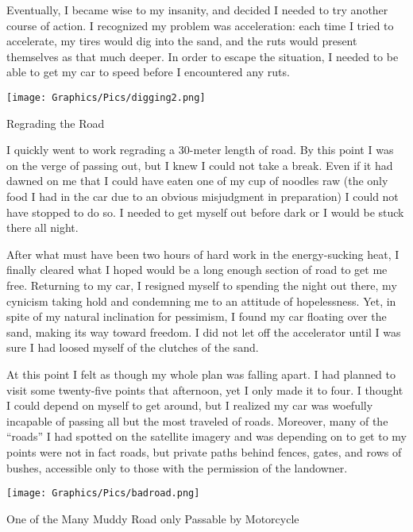 Eventually, I became wise to my insanity, and decided I needed to try another course of action. I recognized my problem was acceleration: each time I tried to accelerate, my tires would dig into the sand, and the ruts would present themselves as that much deeper. In order to escape the situation, I needed to be able to get my car to speed before I encountered any ruts.

\begin{ssfigure}
  \centering
  \texttt{[image: Graphics/Pics/digging2.png]}
  \caption{Regrading the Road}
  \label{pic:digging2}
\end{ssfigure}

I quickly went to work regrading a 30-meter length of road. By this point I was on the verge of passing out, but I knew I could not take a break. Even if it had dawned on me that I could have eaten one of my cup of noodles raw (the only food I had in the car due to an obvious misjudgment in preparation) I could not have stopped to do so. I needed to get myself out before dark or I would be stuck there all night.

After what must have been two hours of hard work in the energy-sucking heat, I finally cleared what I hoped would be a long enough section of road to get me free. Returning to my car, I resigned myself to spending the night out there, my cynicism taking hold and condemning me to an attitude of hopelessness. Yet, in spite of my natural inclination for pessimism, I found my car floating over the sand, making its way toward freedom. I did not let off the accelerator until I was sure I had loosed myself of the clutches of the sand.

At this point I felt as though my whole plan was falling apart. I had planned to visit some twenty-five points that afternoon, yet I only made it to four. I thought I could depend on myself to get around, but I realized my car was woefully incapable of passing all but the most traveled of roads. Moreover, many of the ``roads'' I had spotted on the satellite imagery and was depending on to get to my points were not in fact roads, but private paths behind fences, gates, and rows of bushes, accessible only to those with the permission of the landowner.

\begin{ssfigure}
  \centering
  \texttt{[image: Graphics/Pics/badroad.png]}
  \caption{One of the Many Muddy Road only Passable by Motorcycle}
  \label{pic:badroad}
\end{ssfigure}

